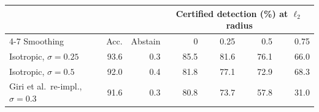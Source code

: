 \begin{tabular}{lrrrrrr}
\toprule
 & & & \multicolumn{4}{c}{Certified detection (\%) at $\ell_2$ radius} \\
\cmidrule(lr){4-7}
Smoothing & Acc. & Abstain & 0 & 0.25 & 0.5 & 0.75 \\
\midrule
Isotropic, $\sigma=0.25$ & 93.6 & 0.3 & 85.5 & 81.6 & 76.1 & 66.0 \\
Isotropic, $\sigma=0.5$ & 92.0 & 0.4 & 81.8 & 77.1 & 72.9 & 68.3 \\
Giri et al.\ re-impl., $\sigma=0.3$ & 91.6 & 0.3 & 80.8 & 73.7 & 57.8 & 31.0 \\
\bottomrule
\end{tabular}
